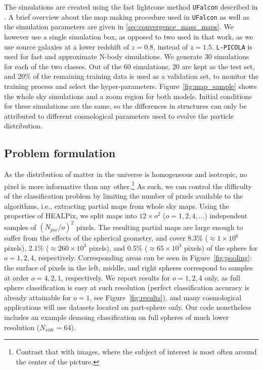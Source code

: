 \documentclass[final,twocolumn,3p,times,sort&compress]{elsarticle}
\newcommand{\figref}[1]{Figure~\ref{fig:#1}}
\newcommand{\1}{\b{1}}              %
\newcommand{\0}{\b{0}}              %
\newcommand{\pkg}[1]{\texttt{#1}}
\begin{document}
The simulations are created using the fast lightcone method \pkg{UFalcon} described in \citep{sgier2018fastgeneration}.
A brief overview about the map making procedure used in \pkg{UFalcon} as well as the simulation parameters are given in \ref{sec:convergence_mass_maps}.
We however use a single simulation box, as opposed to two used in that work, as we use source galaxies at a lower redshift of $z=0.8$, instead of $z=1.5$.
\pkg{L-PICOLA} \citep{howlett2015lpicola} is used for fast and approximate N-body simulations.
We generate $30$ simulations for each of the two classes.
Out of the $60$ simulations, $20$ are kept as the test set, and $20\%$ of the remaining training data is used as a validation set, to monitor the training process and select the hyper-parameters.
\figref{map_sample} shows the whole sky simulations and a zoom region for both models.
Initial conditions for these simulations are the same, so the differences in structures can only be attributed to different cosmological parameters used to evolve the particle distribution.

\subsection{Problem formulation}

As the distribution of matter in the universe is homogeneous and isotropic, no pixel is more informative than any other.\footnote{Contrast that with images, where the subject of interest is most often around the center of the picture.}
As such, we can control the difficulty of the classification problem by limiting the number of pixels available to the algorithms, i.e., extracting partial maps from whole sky maps.
Using the properties of HEALPix, we split maps into $12 \times o^2$ ($o=1,2,4,\dots$) independent samples of $(N_{pix} / o)^2$ pixels. The resulting partial maps are large enough to suffer from the effects of the spherical geometry, and cover 8.3\% ($\approx 1 \times 10^6$ pixels), 2.1\% ($\approx 260 \times 10^3$ pixels), and 0.5\% ($\approx 65 \times 10^3$ pixels) of the sphere for $o=1,2,4$, respectively.
Corresponding areas can be seen in \figref{pooling}: the surface of pixels in the left, middle, and right spheres correspond to samples at order $o=4,2,1$, respectively.
We report results for $o=1,2,4$ only, as full sphere classification is easy at such resolution (perfect classification accuracy is already attainable for $o=1$, see \figref{results}), and many cosmological applications will use datasets located on part-sphere only. Our code nonetheless includes an example demoing classification on full spheres of much lower resolution ($N_{side} = 64$).
\end{document}
